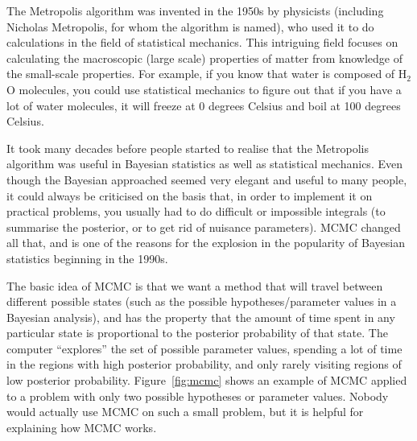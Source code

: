 The Metropolis algorithm was invented in the 1950s by physicists
(including Nicholas Metropolis, for whom the algorithm is named), who used it
to do calculations in the field of statistical mechanics. This intriguing field
focuses on calculating the macroscopic (large scale) properties of matter from
knowledge of the small-scale properties. For example, if you know that water is
composed of H$_2$O molecules, you could use statistical mechanics to figure out
that if you have a lot
of water molecules, it will freeze at 0 degrees Celsius and boil at 100 degrees
Celsius.

It took
many decades before people started to realise that the Metropolis algorithm was
useful in Bayesian
statistics as well as statistical mechanics. Even though the Bayesian approached
seemed very elegant and
useful to many people, it could always be criticised on the basis that, in order
to implement it on practical problems, you usually had to do difficult or
impossible integrals (to summarise the posterior, or to get rid of nuisance
parameters). MCMC changed all that, and is one of the reasons for the
explosion in the popularity of Bayesian statistics beginning in the 1990s.

The basic idea of MCMC is that we want a method that will travel between
different possible states (such as the possible hypotheses/parameter values in
a Bayesian analysis), and has the property that the amount of time spent in
any particular state is proportional to the posterior probability of that state.
The computer ``explores'' the set of possible parameter values, spending a lot
of time in the regions with high posterior probability, and only rarely visiting regions
of low posterior probability. Figure~\ref{fig:mcmc} shows an example of MCMC
applied to a problem with only two possible hypotheses or parameter values.
Nobody would actually use MCMC on such a small problem, but it is helpful for
explaining how MCMC works.

